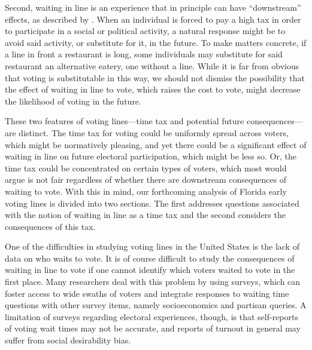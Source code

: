 \documentclass[12pt,titlepage]{article}
\begin{document}
Second, waiting in line is an experience that in principle can have
``downstream'' effects, as described by
\citet{pettigrew:longlinesminorityprecincts}. When an individual is
forced to pay a high tax in order to participate in a social or
political activity, a natural response might be to avoid said
activity, or substitute for it, in the future. To make matters
concrete, if a line in front a restaurant is long, some individuals
may substitute for said restaurant an alternative eatery, one without
a line. While it is far from obvious that voting is substitutable in
this way, we should not dismiss the possibility that the effect of
waiting in line to vote, which raises the cost to vote, might decrease
the likelihood of voting in the future.

These two features of voting lines---time tax and potential future
consequences---are distinct. The time tax for voting could be
uniformly spread across voters, which might be normatively pleasing,
and yet there could be a significant effect of waiting in line on
future electoral participation, which might be less so. Or, the time
tax could be concentrated on certain types of voters, which most would
argue is not fair regardless of whether there are downstream
consequences of waiting to vote. With this in mind, our forthcoming
analysis of Florida early voting lines is divided into two
sections. The first addresses questions associated with the notion of
waiting in line as a time tax and the second considers the
consequences of this tax.

One of the difficulties in studying voting lines in the United States
is the lack of data on who waits to vote. It is of course difficult to
study the consequences of waiting in line to vote if one cannot
identify which voters waited to vote in the first place. Many
researchers deal with this problem by using surveys, which can foster
access to wide swaths of voters and integrate responses to waiting
time questions with other survey items, namely socioeconomics and
partisan queries.  A limitation of surveys regarding electoral
experiences, though, is that self-reports of voting wait times may not
be accurate, and reports of turnout in general may suffer from social
desirability bias.
\end{document}

